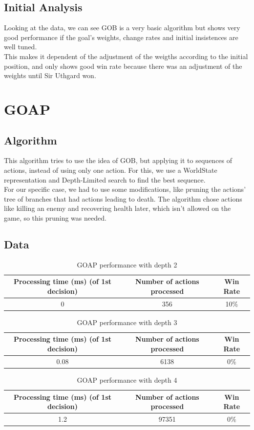 \documentclass{article}
\begin{document}
  \subsection{Initial Analysis}
  Looking at the data, we can see GOB is a very basic algorithm but shows very good performance if the goal's weights, change rates and initial insistences are well tuned.\\
  This makes it dependent of the adjustment of the weigths according to the initial position, and only shows good win rate because there was an adjustment of the weights
  until Sir Uthgard won. 
  \section{GOAP}
  \subsection{Algorithm}
  This algorithm tries to use the idea of GOB, but applying it to sequences of actions, instead of using only one action. For this, we use a WorldState representation 
  and Depth-Limited search to find the best sequence.\\
  For our specific case, we had to use some modifications, like pruning the actions' tree of branches that had actions leading to death. The algorithm chose actions like killing
  an enemy and recovering health later, which isn't allowed on the game, so this pruning was needed.
  \subsection{Data}
  \begin{table}[h!]
    \centering
    \caption{GOAP performance with depth 2}
    \label{tab:tableGOAP1}
    \begin{tabular}{c|c|c}
      \textbf{Processing time (ms) (of 1st decision)} & \textbf{Number of actions processed} & \textbf{Win Rate}\\
      \hline
      0 & 356 & 10\%
    \end{tabular}
  \end{table}
  \begin{table}[h!]
    \centering
    \caption{GOAP performance with depth 3}
    \label{tab:tableGOAP2}
    \begin{tabular}{c|c|c}
      \textbf{Processing time (ms) (of 1st decision)} & \textbf{Number of actions processed} & \textbf{Win Rate}\\
      \hline
      0.08 & 6138 & 0\%
    \end{tabular}
  \end{table}
  \begin{table}[h!]
    \centering
    \caption{GOAP performance with depth 4}
    \label{tab:tableGOAP3}
    \begin{tabular}{c|c|c}
      \textbf{Processing time (ms) (of 1st decision)} & \textbf{Number of actions processed} & \textbf{Win Rate}\\
      \hline
      1.2 & 97351 & 0\%
    \end{tabular}
  \end{table}
\end{document}
